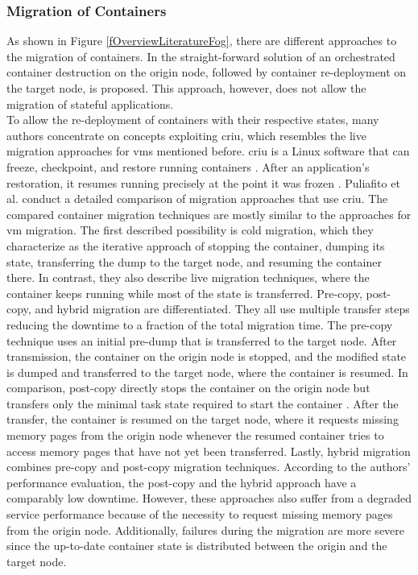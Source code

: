 \subsubsection{Migration of Containers}
\label{lMigrationContainer}
As shown in Figure \ref{fOverviewLiteratureFog}, there are different approaches to the migration of containers. In \cite{Dupont.2017} the straight-forward solution of an orchestrated container destruction on the origin node, followed by container re-deployment on the target node, is proposed. This approach, however, does not allow the migration of stateful applications.\\
To allow the re-deployment of containers with their respective states, many authors concentrate on concepts exploiting \gls{criu}, which resembles the live migration approaches for \gls{vm}s mentioned before. \gls{criu} is a Linux software that can freeze, checkpoint, and restore running containers \cite{.29042020}. After an application's restoration, it resumes running precisely at the point it was frozen \cite{.29042020}. Puliafito et al. \cite{Puliafito.2019} conduct a detailed comparison of migration approaches that use \gls{criu}. The compared container migration techniques are mostly similar to the approaches for \gls{vm} migration. The first described possibility is cold migration, which they characterize as the iterative approach of stopping the container, dumping its state, transferring the dump to the target node, and resuming the container there. In contrast, they also describe live migration techniques, where the container keeps running while most of the state is transferred. Pre-copy, post-copy, and hybrid migration are differentiated. They all use multiple transfer steps reducing the downtime to a fraction of the total migration time. The pre-copy technique uses an initial pre-dump that is transferred to the target node. After transmission, the container on the origin node is stopped, and the modified state is dumped and transferred to the target node, where the container is resumed. In comparison, post-copy directly stops the container on the origin node but transfers only the minimal task state required to start the container \cite{.27112018}. After the transfer, the container is resumed on the target node, where it requests missing memory pages from the origin node whenever the resumed container tries to access memory pages that have not yet been transferred. Lastly, hybrid migration combines pre-copy and post-copy migration techniques. According to the authors' performance evaluation, the post-copy and the hybrid approach have a comparably low downtime. However, these approaches also suffer from a degraded service performance because of the necessity to request missing memory pages from the origin node. Additionally, failures during the migration are more severe since the up-to-date container state is distributed between the origin and the target node.\\
